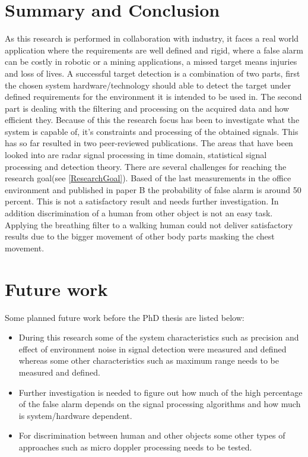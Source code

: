 \documentclass[12pt]{article}
\begin{document}
\section{Summary and Conclusion}

As this research is performed in collaboration with industry, it faces a real world application where the requirements are well defined and rigid, where a false alarm can be costly in robotic or a mining applications, a missed target means injuries and loss of lives. 
A successful target detection is a combination of two parts, first the chosen system hardware/technology should able to detect the target under defined requirements for the environment it is intended to be used in. The second part is dealing with the filtering and processing on the acquired data and how efficient they. Because of this the research focus has been to investigate what the system is capable of, it's constraints and processing of the obtained signals. This has so far resulted in two peer-reviewed publications. The areas that have been looked into are radar signal processing in time domain, statistical signal processing and detection theory. There are several challenges for reaching the research goal(see \ref{ResearchGoal}). Based of the last measurements in the office environment and published in paper B the probability of false alarm is around 50 percent. This is not a satisfactory result and needs further investigation. In addition discrimination of a human from other object is not an easy task. Applying the breathing filter to a walking human could not deliver satisfactory results due to the bigger movement of other body parts masking the chest movement. 

\section{Future work}
Some planned future work before the PhD thesis are listed below:
\begin{itemize}
	\item During this research some of the system characteristics such as precision and effect of environment noise in signal detection were measured and defined whereas some other characteristics such as maximum range needs to be measured and defined.
	\item   Further investigation is needed to figure out how much of the high percentage of the false alarm depends on the signal processing algorithms and how much is system/hardware dependent.
	\item For discrimination between human and other objects some other types of approaches such as micro doppler processing needs to be tested.
\end{itemize}
\end{document}
